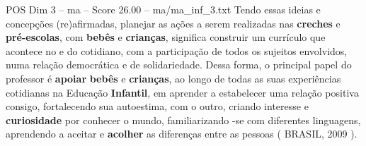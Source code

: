 \begin{textsample}{POS Dim 3 – ma – Score 26.00 – ma/ma\_inf\_3.txt}
Tendo essas ideias e concepções (re)afirmadas, planejar as ações a serem realizadas nas \textbf{creches} e \textbf{pré-escolas}, com \textbf{bebês} e \textbf{crianças}, significa construir um currículo que acontece no e do cotidiano, com a participação de todos os sujeitos envolvidos, numa relação democrática e de solidariedade.
Dessa forma, o principal papel do professor é \textbf{apoiar} \textbf{bebês} e \textbf{crianças}, ao longo de todas as suas experiências cotidianas na Educação \textbf{Infantil}, em aprender a estabelecer uma relação positiva consigo, fortalecendo sua autoestima, com o outro, criando interesse e \textbf{curiosidade} por conhecer o mundo, familiarizando -se com diferentes linguagens, aprendendo a aceitar e \textbf{acolher} as diferenças entre as pessoas ( BRASIL, 2009 ).

\end{textsample}
